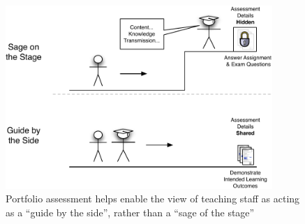 \begin{figure}[hb]
	\centering
	\includegraphics[width=0.90\textwidth]{SageGuide}
	\caption{Portfolio assessment helps enable the view of teaching staff as acting as a ``guide by the side'', rather than a ``sage of the stage''}
	\label{fig:sage_guide}
\end{figure}

